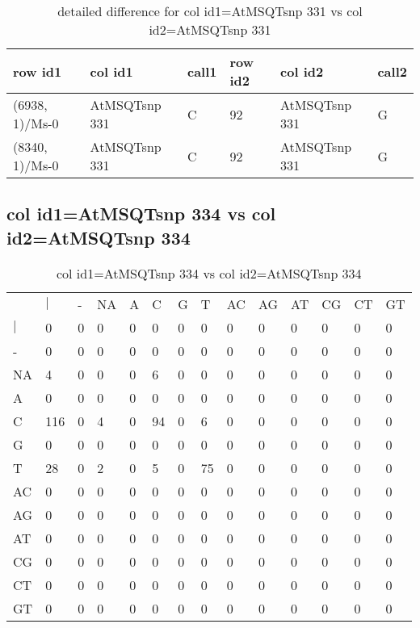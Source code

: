 \begin{center}
\begin{longtable}{|l|l|l|l|l|l|}
\caption{detailed difference for col id1=AtMSQTsnp 331 vs col id2=AtMSQTsnp 331} \label{table_dm861}\\
\hline
row id1&col id1&call1&row id2&col id2&call2\\
\hline
(6938, 1)/Ms-0&AtMSQTsnp 331&C&92&AtMSQTsnp 331&G\\
(8340, 1)/Ms-0&AtMSQTsnp 331&C&92&AtMSQTsnp 331&G\\
\hline
\end{longtable}
\end{center}

\subsection{col id1=AtMSQTsnp 334 vs col id2=AtMSQTsnp 334}
\begin{center}
\begin{longtable}{|l|l|l|l|l|l|l|l|l|l|l|l|l|l|}
\caption{col id1=AtMSQTsnp 334 vs col id2=AtMSQTsnp 334} \label{table_dm862}\\
\hline
\\
\hline
&$|$&-&NA&A&C&G&T&AC&AG&AT&CG&CT&GT\\
$|$&0&0&0&0&0&0&0&0&0&0&0&0&0\\
-&0&0&0&0&0&0&0&0&0&0&0&0&0\\
NA&4&0&0&0&6&0&0&0&0&0&0&0&0\\
A&0&0&0&0&0&0&0&0&0&0&0&0&0\\
C&116&0&4&0&94&0&6&0&0&0&0&0&0\\
G&0&0&0&0&0&0&0&0&0&0&0&0&0\\
T&28&0&2&0&5&0&75&0&0&0&0&0&0\\
AC&0&0&0&0&0&0&0&0&0&0&0&0&0\\
AG&0&0&0&0&0&0&0&0&0&0&0&0&0\\
AT&0&0&0&0&0&0&0&0&0&0&0&0&0\\
CG&0&0&0&0&0&0&0&0&0&0&0&0&0\\
CT&0&0&0&0&0&0&0&0&0&0&0&0&0\\
GT&0&0&0&0&0&0&0&0&0&0&0&0&0\\
\hline
\end{longtable}
\end{center}

